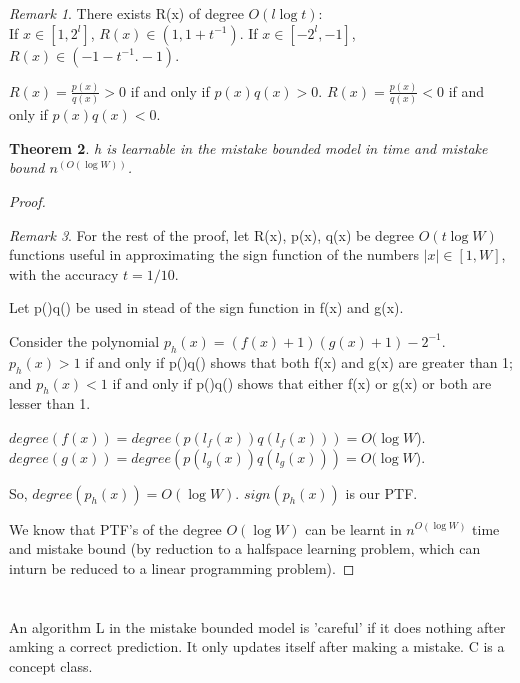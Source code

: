 \documentclass[10pt]{amsart}
\newtheorem{thm}{Theorem}[subsection]
\theoremstyle{remark}
\newtheorem{rem}[thm]{Remark}
\begin{document}
\begin{rem}
There exists R(x) of degree $O(l\log t)$:\\
If $x \in [1,2^{l}]$, $R(x) \in (1,1+t^{-1})$.
If $x \in [-2^{l}, -1]$, $R(x) \in (-1-t^{-1}. -1)$.

$R(x) = \frac{p(x)}{q(x)} > 0$ if and only if $p(x)q(x) > 0$. $R(x) = \frac{p(x)}{q(x)} < 0$ if and only if $p(x)q(x) < 0$. 
\end{rem}

\begin{thm}
h is learnable in the mistake bounded model in time and mistake bound $n^{(O(\log W))}$.
\end{thm}
\begin{proof}
\begin{rem}
For the rest of the proof, let R(x), p(x), q(x) be degree $O(t \log W)$ functions useful in approximating the sign function of the numbers $|x| \in [1,W]$, with the accuracy $t=1/10$.
\end{rem}
Let p()q() be used in stead of the sign function in f(x) and g(x).

Consider the polynomial $p_{h}(x) = (f(x)+1)(g(x)+1) - 2^{-1}$. $p_{h}(x)>1$ if and only if p()q() shows that both f(x) and g(x) are greater than 1; and  $p_{h}(x)<1$ if and only if p()q() shows that either f(x) or g(x) or both are lesser than 1.

$degree(f(x)) = degree(p(l_{f}(x))q(l_{f}(x))) = O(\log W$).\\
$degree(g(x)) = degree(p(l_{g}(x))q(l_{g}(x))) = O(\log W$).

So, $degree(p_{h}(x)) = O(\log W)$. $sign(p_{h}(x))$ is our PTF.

We know that PTF's of the degree $O(\log W)$ can be learnt in $n^{O(\log W)}$ time and mistake bound (by reduction to a halfspace learning problem, which can inturn be reduced to a linear programming problem).
\end{proof}

\section{}
An algorithm L in the mistake bounded model is 'careful' if it does nothing after amking a correct prediction. It only updates itself after making a mistake. C is a concept class.
\end{document}
